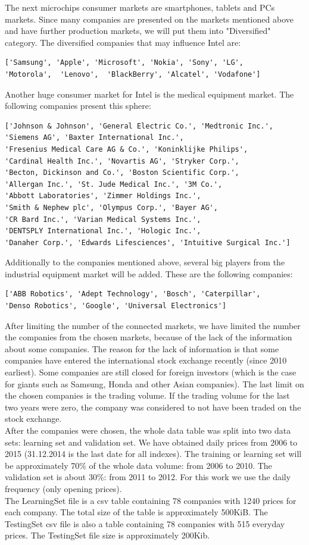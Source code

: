 \documentclass [twoside,
  11pt, a4paper,
  footinclude=true,
  headinclude=true,
  cleardoublepage=empty
]{article}
\begin{document}
The next microchips consumer markets are smartphones, tablets and PCs markets. Since many companies are presented on the markets mentioned above and have further production markets, we will put them into "Diversified" category. The diversified companies that may influence Intel are:
\begin{verbatim}
['Samsung', 'Apple', 'Microsoft', 'Nokia', 'Sony', 'LG',
'Motorola',  'Lenovo',  'BlackBerry', 'Alcatel', 'Vodafone']
\end{verbatim} 
Another huge consumer market for Intel is the medical equipment market. The following companies present this sphere:
\begin{verbatim}
['Johnson & Johnson', 'General Electric Co.', 'Medtronic Inc.',
'Siemens AG', 'Baxter International Inc.', 
'Fresenius Medical Care AG & Co.', 'Koninklijke Philips',
'Cardinal Health Inc.', 'Novartis AG', 'Stryker Corp.',
'Becton, Dickinson and Co.', 'Boston Scientific Corp.',
'Allergan Inc.', 'St. Jude Medical Inc.', '3M Co.',
'Abbott Laboratories', 'Zimmer Holdings Inc.', 
'Smith & Nephew plc', 'Olympus Corp.', 'Bayer AG',
'CR Bard Inc.', 'Varian Medical Systems Inc.',
'DENTSPLY International Inc.', 'Hologic Inc.', 
'Danaher Corp.', 'Edwards Lifesciences', 'Intuitive Surgical Inc.']
\end{verbatim}
Additionally to the companies mentioned above, several big players from the industrial equipment market will be added. These are the following companies:
\begin{verbatim} 
['ABB Robotics', 'Adept Technology', 'Bosch', 'Caterpillar',
'Denso Robotics', 'Google', 'Universal Electronics']
\end{verbatim}
After limiting the number of the connected markets, we have limited the number the companies from the chosen markets, because of the lack of the information about some companies. The reason for the lack of information is that some companies have entered the international stock exchange recently (since 2010 earliest). Some companies are still closed for foreign investors (which is the case for giants such as Samsung, Honda and other Asian companies). The last limit on the chosen companies is the trading volume. If  the trading volume for the last two years were zero, the company was considered to not have been traded on the stock exchange.\\
After the companies were chosen, the whole data table was split into two data sets: learning set and validation set. We have obtained daily prices from 2006 to 2015 (31.12.2014 is the last date for all indexes). The training or learning set will be approximately 70\% of the whole data volume: from 2006 to 2010. The validation set is about 30\%: from 2011 to 2012. For this work we use the daily frequency (only opening prices).\\
The LearningSet file is a csv table containing 78 companies with 1240 prices for each company. The total size of the table is approximately 500KiB. The TestingSet csv file is also a table containing 78 companies with 515 everyday prices. The TestingSet file size is approximately 200Kib.\\
\end{document}
